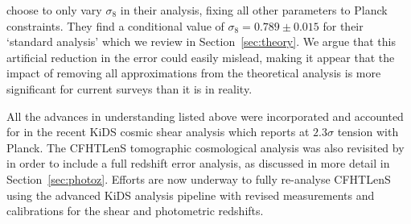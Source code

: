\citet{kitching/etal:2016} choose to only vary $\sigma_8$ in their analysis, fixing all other parameters to Planck constraints.  They find a conditional value of $\sigma_8 = 0.789 \pm 0.015$ for their `standard analysis' which we review in Section~\ref{sec:theory}.    We argue that this artificial reduction in the error could easily mislead, making it appear that the impact of removing all approximations from the theoretical analysis is more significant for current surveys than it is in reality.

All the advances in understanding listed above were incorporated and accounted for in the recent KiDS cosmic shear analysis \citep{hildebrandt/etal:2016} which reports at $2.3 \sigma$ tension with Planck.  The CFHTLenS tomographic cosmological analysis was also revisited by \citet{joudaki/etal:2016} in order to include a full redshift error analysis, as discussed in more detail in Section~\ref{sec:photoz}.  Efforts are now underway to fully re-analyse CFHTLenS using the advanced KiDS analysis pipeline with revised measurements and calibrations for the shear and photometric redshifts.  

